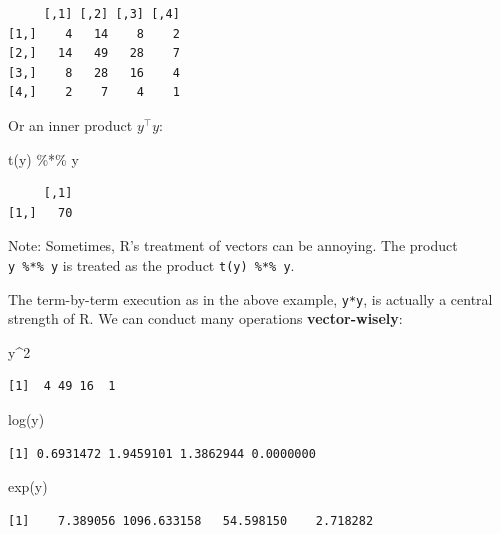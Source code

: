 \documentclass[
  letterpaper,
  DIV=11,
  numbers=noendperiod]{scrreprt}
\newenvironment{Shaded}{\begin{snugshade}}{\end{snugshade}}
\newcommand{\DecValTok}[1]{\textcolor[rgb]{0.68,0.00,0.00}{#1}}
\newcommand{\FunctionTok}[1]{\textcolor[rgb]{0.28,0.35,0.67}{#1}}
\newcommand{\NormalTok}[1]{\textcolor[rgb]{0.00,0.23,0.31}{#1}}
\newcommand{\SpecialCharTok}[1]{\textcolor[rgb]{0.37,0.37,0.37}{#1}}
\theoremstyle{definition}
\theoremstyle{plain}
\theoremstyle{plain}
\theoremstyle{remark}
\begin{document}
\begin{verbatim}
     [,1] [,2] [,3] [,4]
[1,]    4   14    8    2
[2,]   14   49   28    7
[3,]    8   28   16    4
[4,]    2    7    4    1
\end{verbatim}

Or an inner product \(y^\top y\):

\begin{Shaded}
\begin{Highlighting}[]
\FunctionTok{t}\NormalTok{(y) }\SpecialCharTok{\%*\%}\NormalTok{ y}
\end{Highlighting}
\end{Shaded}

\begin{verbatim}
     [,1]
[1,]   70
\end{verbatim}

Note: Sometimes, R's treatment of vectors can be annoying. The product
\texttt{y\ \%*\%\ y} is treated as the product \texttt{t(y)\ \%*\%\ y}.

The term-by-term execution as in the above example, \texttt{y*y}, is
actually a central strength of R. We can conduct many operations
\textbf{vector-wisely}:

\begin{Shaded}
\begin{Highlighting}[]
\NormalTok{y}\SpecialCharTok{\^{}}\DecValTok{2}
\end{Highlighting}
\end{Shaded}

\begin{verbatim}
[1]  4 49 16  1
\end{verbatim}

\begin{Shaded}
\begin{Highlighting}[]
\FunctionTok{log}\NormalTok{(y)}
\end{Highlighting}
\end{Shaded}

\begin{verbatim}
[1] 0.6931472 1.9459101 1.3862944 0.0000000
\end{verbatim}

\begin{Shaded}
\begin{Highlighting}[]
\FunctionTok{exp}\NormalTok{(y)}
\end{Highlighting}
\end{Shaded}

\begin{verbatim}
[1]    7.389056 1096.633158   54.598150    2.718282
\end{verbatim}
\end{document}
